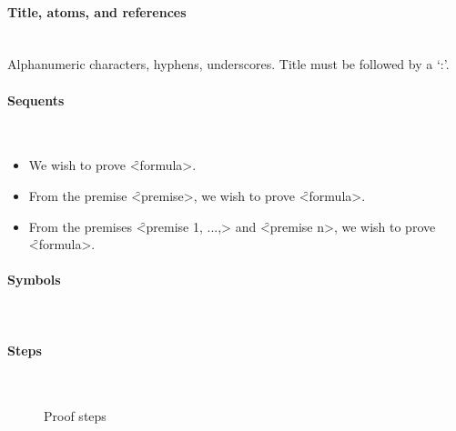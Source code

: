 \documentclass[manual.tex]{subfiles}
\begin{document}
\paragraph{Title, atoms, and references} ~\\
Alphanumeric characters, hyphens, underscores.
Title must be followed by a `:'.

\paragraph{Sequents} ~
\begin{itemize}
\item We wish to prove \f{<formula>}.
\item From the premise \f{<premise>}, we wish to prove \f{<formula>}.
\item From the premises \f{<premise 1, ...,>} and 
        \f{<premise n>}, we wish to prove \f{<formula>}.
\end{itemize}

\paragraph{Symbols} ~

\begin{figure}[H]

\end{figure}

\paragraph{Steps} ~

\begin{figure}[H]
\scriptsize

\caption{Proof steps}
\label{steps}
\end{figure}
\end{document}
